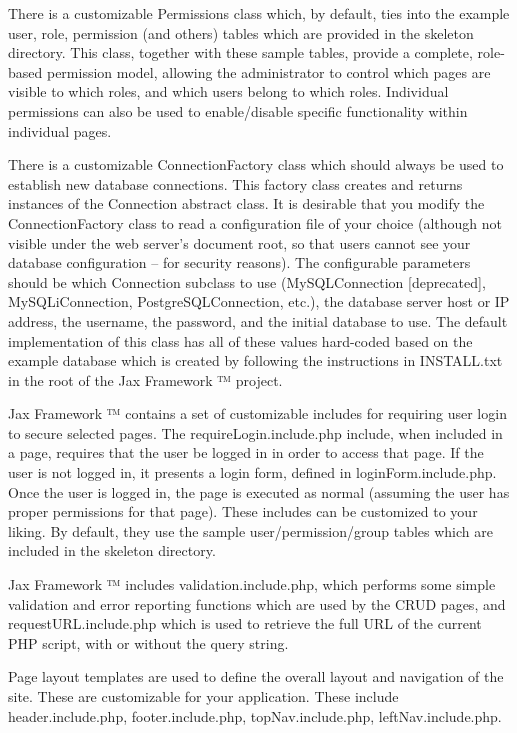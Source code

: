 \documentclass[letterpaper,10pt,english]{sphinxmanual}
\begin{document}
There is a customizable Permissions class which, by default, ties into the example user, role,
permission (and others) tables which are provided in the skeleton directory.  This class, together
with these sample tables, provide a complete, role-based permission model, allowing the
administrator to control which pages are visible to which roles, and which users belong to which
roles.  Individual permissions can also be used to enable/disable specific functionality within
individual pages.

There is a customizable ConnectionFactory class which should always be used to establish new
database connections.  This factory class creates and returns instances of the Connection abstract
class.  It is desirable that you modify the ConnectionFactory class to read a configuration file of
your choice (although not visible under the web server's document root, so that users cannot see
your database configuration -- for security reasons).  The configurable parameters should be which
Connection subclass to use (MySQLConnection {[}deprecated{]}, MySQLiConnection, PostgreSQLConnection,
etc.), the database server host or IP address, the username, the password, and the initial database
to use.  The default implementation of this class has all of these values hard-coded based on the
example database which is created by following the instructions in INSTALL.txt in the root of the
Jax Framework ™ project.

Jax Framework ™ contains a set of customizable includes for requiring user login to secure
selected pages.  The requireLogin.include.php include, when included in a page, requires that the
user be logged in in order to access that page.  If the user is not logged in, it presents a login
form, defined in loginForm.include.php.  Once the user is logged in, the page is executed as normal
(assuming the user has proper permissions for that page).  These includes can be customized to your
liking.  By default, they use the sample user/permission/group tables which are included in the
skeleton directory.

Jax Framework ™ includes validation.include.php, which performs some simple validation and
error reporting functions which are used by the CRUD pages, and requestURL.include.php which is
used to retrieve the full URL of the current PHP script, with or without the query string.

Page layout templates are used to define the overall layout and navigation of the site.  These are
customizable for your application.  These include header.include.php, footer.include.php,
topNav.include.php, leftNav.include.php.
\end{document}
